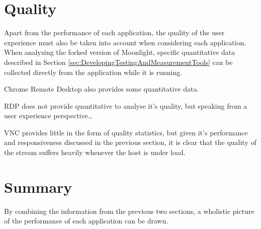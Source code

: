 \section{Quality}

Apart from the performance of each application, the quality of the user experience must also be taken into account when considering each application.
When analyzing the forked version of Moonlight, specific quantitative data described in Section \ref{sec:DevelopingTestingAndMeasurementTools} can be collected directly from the application while it is running.

Chrome Remote Desktop also provides some quantitative data.

RDP does not provide quantitative to analyse it's quality, but speaking from a user experience perspective\dots

VNC provides little in the form of quality statistics, but given it's performance and responsiveness discussed in the previous section, it is clear that the quality of the stream suffers heavily whenever the host is under load.

\section{Summary}

By combining the information from the previous two sections, a wholistic picture of the performance of each application can be drawn.

\todosection